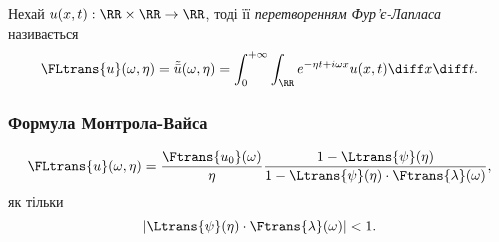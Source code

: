 \begin{definition}
    Нехай $u(x, t): \RR \times \RR \to \RR$, тоді її \textit{перетворенням Фур'є-Лапласа} називається 
    \begin{equation}
        \FLtrans{u}(\omega, \eta) = \tilde{\bar{u}}(\omega, \eta) = \int_0^{+\infty} \int_\RR e^{-\eta t + i \omega x} u(x, t) \diff x \diff t.
    \end{equation}
\end{definition}

\subsubsection{Формула Монтрола-Вайса}

\begin{th_formula}
    \begin{equation}
        \FLtrans{u}(\omega, \eta) = \frac{\Ftrans{u_0}(\omega)}{\eta} \frac{1 - \Ltrans{\psi}(\eta)}{1 - \Ltrans{\psi}(\eta) \cdot \Ftrans{\lambda}(\omega)},
    \end{equation}
    як тільки
    \begin{equation}
        |\Ltrans{\psi}(\eta) \cdot \Ftrans{\lambda}(\omega)| < 1.
    \end{equation}
\end{th_formula}
